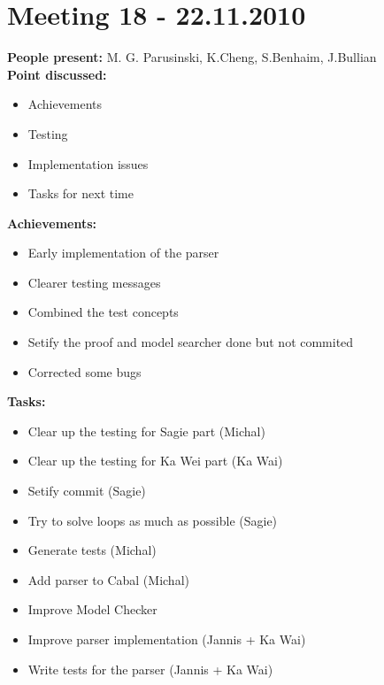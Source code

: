 \documentclass[12pt]{article}
\begin{document}
\section*{Meeting 18 - 22.11.2010}
\textbf{People present:} M. G. Parusinski, K.Cheng, S.Benhaim, J.Bullian \\
\textbf{Point discussed:}
\begin{itemize}
\item Achievements
\item Testing
\item Implementation issues
\item Tasks for next time
\end{itemize}
\textbf{Achievements:}
\begin{itemize}
\item Early implementation of the parser
\item Clearer testing messages
\item Combined the test concepts
\item Setify the proof and model searcher done but not commited
\item Corrected some bugs
\end{itemize}
\textbf{Tasks:}
\begin{itemize}
\item Clear up the testing for Sagie part (Michal)
\item Clear up the testing for Ka Wei part (Ka Wai)
\item Setify commit (Sagie)
\item Try to solve loops as much as possible (Sagie)
\item Generate tests (Michal)
\item Add parser to Cabal (Michal)
\item Improve Model Checker
\item Improve parser implementation (Jannis + Ka Wai)
\item Write tests for the parser (Jannis + Ka Wai)
\end{itemize}
\end{document}
